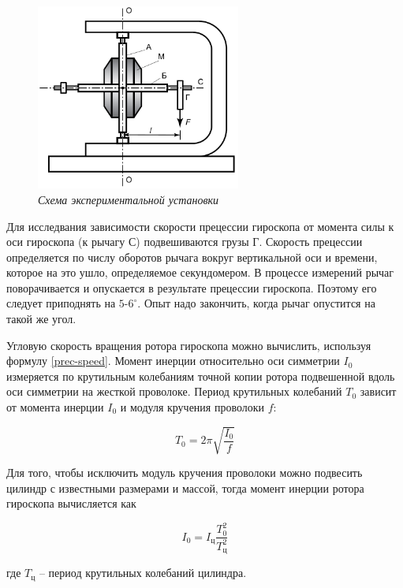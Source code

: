 \documentclass[a4paper,12pt]{article}
\begin{document}
\begin{figure}[h!]
        \centering
	\includegraphics[width=0.6\textwidth]{ustan.png}
	\caption{\textit{Схема экспериментальной установки}}
	\label{ustan}
\end{figure}

Для исследвания зависимости скорости прецессии гироскопа от момента силы к оси гироскопа (к рычагу С) подвешиваются грузы Г. Скорость прецессии определяется по числу оборотов рычага вокруг вертикальной оси и времени, которое на это ушло, определяемое секундомером. В процессе измерений рычаг поворачивается и опускается в результате прецессии гироскопа. Поэтому его следует приподнять на $\text{5-6}^\circ$. Опыт надо закончить, когда рычаг опустится на такой же угол.

Угловую скорость вращения ротора гироскопа можно вычислить, используя формулу \eqref{prec-speed}. Момент инерции относительно оси симметрии $I_0$ измеряется по крутильным колебаниям точной копии ротора подвешенной вдоль оси симметрии на жесткой проволоке. Период крутильных колебаний $T_0$ зависит от момента инерции $I_0$ и модуля кручения проволоки $f$:

\begin{equation}
    T_{0} = 2 \pi \sqrt{\frac{I_{0}}{f}}
\end{equation}

Для того, чтобы исключить модуль кручения проволоки можно подвесить цилиндр с известными размерами и массой, тогда момент инерции ротора гироскопа вычисляется как

\begin{equation}\label{rotor-inertia}
    I_{0} = I_{\text{ц}} \frac{T_{0}^2}{T_{\text{ц}}^2}
\end{equation}

где $T_{\text{ц}}$ -- период крутильных колебаний цилиндра.
\end{document}
